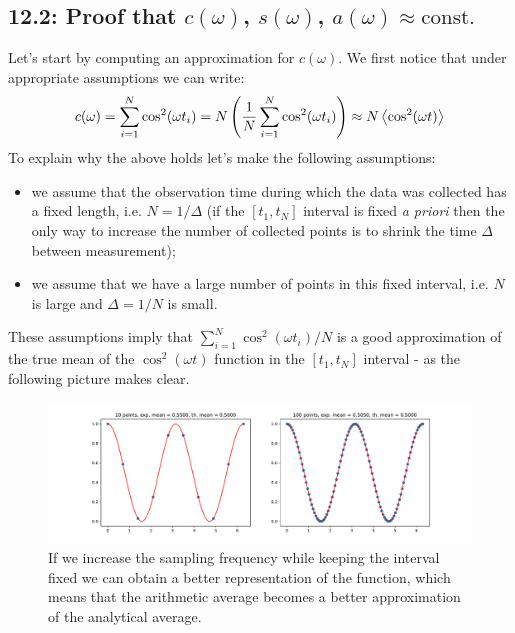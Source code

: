 \documentclass[a4paper]{article}
\newcommand{\tonde}[1]{\left( {#1} \right)}
\begin{document}
\subsection{12.2: Proof that $c(\omega)$, $s(\omega)$, $a(\omega) \approx \text{const.}$}
Let's start by computing an approximation for $c(\omega)$. We first notice that under appropriate assumptions we can write:
\begin{equation*}
    c(\omega) = \sum_{i=1}^N \cos^2(\omega t_i) = N \tonde{\frac{1}{N}\sum_{i=1}^N \cos^2(\omega t_i)}\approx N \expval{\cos^2 (\omega t)}
\end{equation*}
To explain why the above holds let's make the following assumptions:
\begin{itemize}
    \item we assume that the observation time during which the data was collected has a fixed length, i.e. $N=1/\Delta$ (if the $[t_1, t_N]$ interval is fixed \emph{a priori} then the only way to increase the number of collected points is to shrink the time $\Delta$ between measurement);
    \item we assume that we have a large number of points in this fixed interval, i.e. $N$ is large and $\Delta = 1/N$ is small.
\end{itemize}
These assumptions imply that $\sum_{i=1}^N \cos^2(\omega t_i)/N$ is a good approximation of the true mean of the $\cos^2(\omega t)$ function in the $[t_1, t_N]$ interval - as the following picture makes clear.

\begin{figure}[H]
    \centering
    \includegraphics[width=1.5\textwidth]{test.pdf}
    \caption{If we increase the sampling frequency while keeping the interval fixed we can obtain a better representation of the function, which means that the arithmetic average becomes a better approximation of the analytical average.}
\end{figure}
\end{document}
